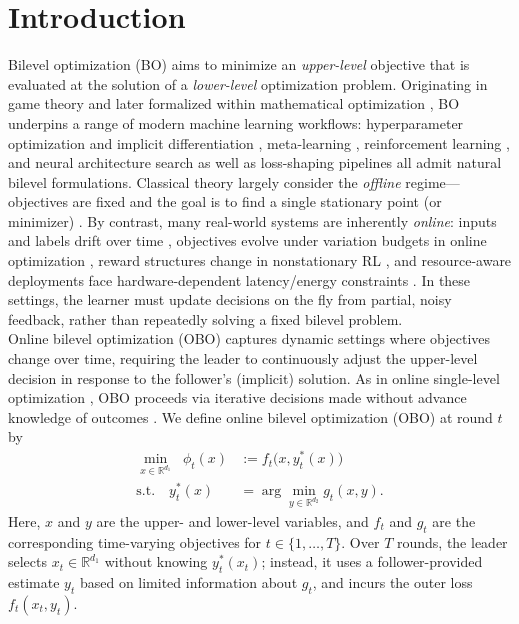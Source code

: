 \documentclass{uai2026} %
\begin{document}
\section{Introduction}\label{sec:intro}
Bilevel optimization (BO) aims to minimize an \emph{upper-level} objective that is evaluated at the solution of a \emph{lower-level} optimization problem. Originating in game theory \citep{von1953theory} and later formalized within mathematical optimization \citep{bracken1973mathematical}, BO underpins a range of modern machine learning workflows: hyperparameter optimization and implicit differentiation \citep{lorraine2020implicit,franceschi2018bilevel}, meta-learning \citep{ji2021bilevel}, reinforcement learning \citep{stadie2020intrinsic}, and neural architecture search as well as loss-shaping pipelines \citep{liu2018darts,li2021autobalance} all admit natural bilevel formulations.
Classical theory largely consider the \emph{offline} regime—objectives are fixed and the goal is to find a single stationary point (or minimizer) \citep{bracken1973mathematical,maclaurin2015reversible,ji2021bilevel,chen2025fullyfirstorder}. By contrast, many real-world systems are inherently \emph{online}: inputs and labels drift over time \citep{gama2014conceptdrift,quionero2009datasetshift}, objectives evolve under variation budgets in online optimization \citep{besbes2015nonstationary}, reward structures change in nonstationary RL \citep{padakandla2019nonstationary}, and resource-aware deployments face hardware-dependent latency/energy constraints \citep{cai2020onceforall}. In these settings, the learner must update decisions on the fly from partial, noisy feedback, rather than repeatedly solving a fixed bilevel problem.\\
Online bilevel optimization (OBO) captures dynamic settings where objectives change over time, requiring the leader to continuously adjust the upper-level decision in response to the follower’s (implicit) solution. As in online single-level optimization \citep{hazan2016oco}, OBO proceeds via iterative decisions made without advance knowledge of outcomes \citep{tarzanagh2024online,OBORegretAnon}. We define online bilevel optimization (OBO) at round \(t\) by
\begin{align}\label{eq_def_OBO}
\min_{x \in \mathbb{R}^{d_1}} \;\; \phi_t(x) &:= f_t\bigl(x, y_t^{*}(x)\bigr) \\
\text{s.t.}\quad y_t^{*}(x) &= \arg\min_{y \in \mathbb{R}^{d_2}} g_t(x,y).
\end{align}
Here, \(x\) and \(y\) are the upper- and lower-level variables, and \(f_t\) and \(g_t\) are the corresponding time-varying objectives for \(t \in \{1,\dots,T\}\).
Over \(T\) rounds, the leader selects \(x_t \in \mathbb{R}^{d_1}\) without knowing \(y_t^{*}(x_t)\); instead, it uses a follower-provided estimate \(y_t\) based on limited information about \(g_t\), and incurs the outer loss \(f_t(x_t, y_t)\).
\end{document}
